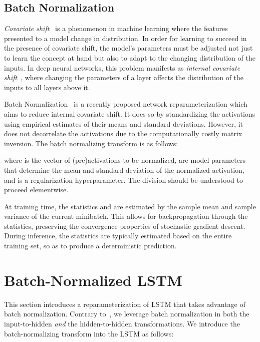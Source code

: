 \documentclass{article} \pdfoutput=1 \usepackage[utf8]{inputenc}
\begin{document}
\subsection{Batch Normalization}

\emph{Covariate shift}~\citep{shimodaira2000improving} is a phenomenon in machine learning where
the features presented to a model change in distribution.
In order for learning to succeed in the presence of covariate shift,
the model's parameters must be adjusted not just to learn the concept at hand
but also to adapt to the changing distribution of the inputs.
In deep neural networks, this problem manifests as \emph{internal covariate shift}~\citep{batchnorm},
where changing the parameters of a layer affects the distribution of the inputs to all layers above it.

Batch Normalization~\citep{batchnorm} is a recently proposed network
reparameterization which aims to reduce internal covariate shift.  It does so by
standardizing the activations using empirical estimates of their means and
standard deviations.  However, it does not decorrelate the activations due to
the computationally costly matrix inversion.  The batch normalizing transform
is as follows:



where  is the vector of (pre)activations to be
normalized,  are model parameters that
determine the mean and standard deviation of the normalized activation, and
 is a regularization hyperparameter. The division should
be understood to proceed elementwise.

At training time, the statistics  and
 are estimated by the sample mean and sample variance
of the current minibatch.  This allows for backpropagation through the
statistics, preserving the convergence properties of stochastic gradient
descent.  During inference, the statistics are typically estimated based on the
entire training set, so as to produce a deterministic prediction.

\section{Batch-Normalized LSTM}
\label{sec:recurrent-batch-normalization}

This section introduces a reparameterization of LSTM that takes advantage of
batch normalization. Contrary to~\citet{cesar, baidu}, we leverage batch
normalization in both the input-to-hidden \emph{and} the hidden-to-hidden
transformations.  We introduce the batch-normalizing transform  into the LSTM as follows:
\end{document}
